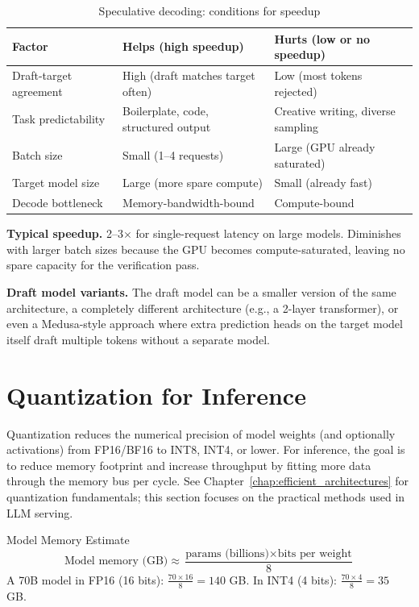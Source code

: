 \begin{table}[H]
\centering
\caption{Speculative decoding: conditions for speedup}
\begin{tabularx}{\textwidth}{lXX}
\toprule
\textbf{Factor} & \textbf{Helps (high speedup)} & \textbf{Hurts (low or no speedup)} \\
\midrule
Draft-target agreement & High (draft matches target often) & Low (most tokens rejected) \\
Task predictability & Boilerplate, code, structured output & Creative writing, diverse sampling \\
Batch size & Small (1--4 requests) & Large (GPU already saturated) \\
Target model size & Large (more spare compute) & Small (already fast) \\
Decode bottleneck & Memory-bandwidth-bound & Compute-bound \\
\bottomrule
\end{tabularx}
\end{table}

\textbf{Typical speedup.} 2--3$\times$ for single-request latency on large models. Diminishes with larger batch sizes because the GPU becomes compute-saturated, leaving no spare capacity for the verification pass.

\textbf{Draft model variants.} The draft model can be a smaller version of the same architecture, a completely different architecture (e.g., a 2-layer transformer), or even a Medusa-style approach where extra prediction heads on the target model itself draft multiple tokens without a separate model.

\section{Quantization for Inference}
\label{sec:quant_inference}

Quantization reduces the numerical precision of model weights (and optionally activations) from FP16/BF16 to INT8, INT4, or lower. For inference, the goal is to reduce memory footprint and increase throughput by fitting more data through the memory bus per cycle. See Chapter~\ref{chap:efficient_architectures} for quantization fundamentals; this section focuses on the practical methods used in LLM serving.

\begin{mathresult}{Model Memory Estimate}
\[
\text{Model memory (GB)} \approx \frac{\text{params (billions)} \times \text{bits per weight}}{8}
\]
A 70B model in FP16 (16 bits): $\frac{70 \times 16}{8} = 140$ GB. In INT4 (4 bits): $\frac{70 \times 4}{8} = 35$ GB.
\end{mathresult}

